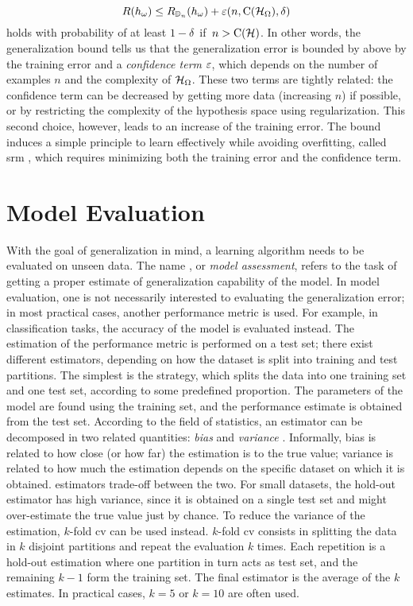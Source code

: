 $$R(h_{\omega}) \leq R_{\Data_n}(h_{\omega}) + \eps(n, \Fun{C}(\HypSpace), \delta)$$
holds with probability of at least $1 - \delta\,$ if $\,n > \Fun{C}(\Cal{H})$. In other words, the generalization bound tells us that the generalization error is bounded by above by the training error and a \emph{confidence term} $\varepsilon$, which depends on the number of examples $n$ and the complexity of $\HypSpace$. These two terms are tightly related: the confidence term can be decreased by getting more data (increasing $n$) if possible, or by restricting the complexity of the hypothesis space using regularization. This second choice, however, leads to an increase of the training error. The bound induces a simple principle to learn effectively while avoiding overfitting, called \gls{srm} \citep{vapnik2000slt}, which requires minimizing both the training error and the confidence term.

\section{Model Evaluation}\label{sec:model-selection}
With the goal of generalization in mind, a learning algorithm needs to be evaluated on unseen data. The name , or \emph{model assessment}, refers to the task of getting a proper estimate of generalization capability of the model. In model evaluation, one is not necessarily interested to evaluating the generalization error; in most practical cases, another performance metric is used. For example, in classification tasks, the accuracy of the model is evaluated instead. The estimation of the performance metric is performed on a test set; there exist different estimators, depending on how the dataset is split into training and test partitions. The simplest is the  strategy, which splits the data into one training set and one test set, according to some predefined proportion. The parameters of the model are found using the training set, and the performance estimate is obtained from the test set. According to the field of statistics, an estimator can be decomposed in two related quantities: \emph{bias} and \emph{variance} \citep{hastie2009elements}. Informally, bias is related to how close (or how far) the estimation is to the true value; variance is related to how much the estimation depends on the specific dataset on which it is obtained.  estimators trade-off between the two. For small datasets, the hold-out estimator has high variance, since it is obtained on a single test set and might over-estimate the true value just by chance. To reduce the variance of the estimation, $k$-fold \gls{cv} \citep{arlot2010cv} can be used instead. $k$-fold \gls{cv} consists in splitting the data in $k$ disjoint partitions and repeat the evaluation $k$ times. Each repetition is a hold-out estimation where one partition in turn acts as test set, and the remaining $k-1$ form the training set. The final estimator is the average of the $k$ estimates. In practical cases, $k=5$ or $k=10$ are often used.

